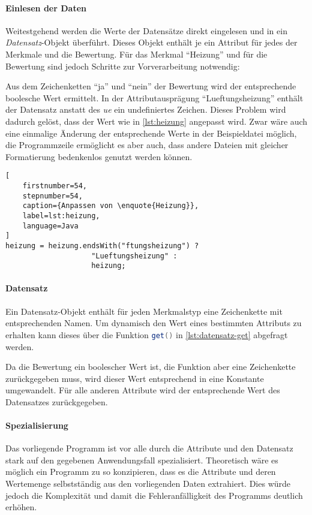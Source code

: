 \paragraph{Einlesen der Daten}
Weitestgehend werden die Werte der Datensätze direkt eingelesen und in ein \emph{Datensatz}-Objekt überführt.
Dieses Objekt enthält je ein Attribut für jedes der Merkmale und die Bewertung.
Für das Merkmal \enquote{Heizung} und für die Bewertung sind jedoch Schritte zur Vorverarbeitung notwendig:

Aus dem Zeichenketten \enquote{ja} und \enquote{nein} der Bewertung wird der entsprechende boolesche Wert ermittelt.
In der Attributausprägung \enquote{Lueftungsheizung} enthält der Datensatz anstatt des \textit{ue} ein undefiniertes Zeichen.
Dieses Problem wird dadurch gelöst, dass der Wert wie in \autoref{lst:heizung} angepasst wird.
Zwar wäre auch eine einmalige Änderung der entsprechende Werte in der Beispieldatei möglich,
die Programmzeile ermöglicht es aber auch, dass andere Dateien mit gleicher Formatierung bedenkenlos genutzt werden können.

\begin{lstlisting}[
    firstnumber=54,
    stepnumber=54,
    caption={Anpassen von \enquote{Heizung}},
    label=lst:heizung,
    language=Java
]
heizung = heizung.endsWith("ftungsheizung") ?
                    "Lueftungsheizung" :
                    heizung;
\end{lstlisting}

\paragraph{Datensatz}
Ein Datensatz-Objekt enthält für jeden Merkmalstyp eine Zeichenkette mit entsprechenden Namen.
Um dynamisch den Wert eines bestimmten Attributs zu erhalten kann dieses über die Funktion \lstinline[language=Java]{get()}
in \autoref{lst:datensatz-get} abgefragt werden.



Da die Bewertung ein boolescher Wert ist, die Funktion aber eine Zeichenkette zurückgegeben muss,
wird dieser Wert entsprechend in eine Konstante umgewandelt.
Für alle anderen Attribute wird der entsprechende Wert des Datensatzes zurückgegeben.

\paragraph{Spezialisierung}
Das vorliegende Programm ist vor alle durch die Attribute und den Datensatz stark auf den gegebenen Anwendungsfall spezialisiert.
Theoretisch wäre es möglich ein Programm zu so konzipieren, dass es die Attribute und deren Wertemenge selbstständig aus den vorliegenden Daten extrahiert.
Dies würde jedoch die Komplexität und damit die Fehleranfälligkeit des Programms deutlich erhöhen.

